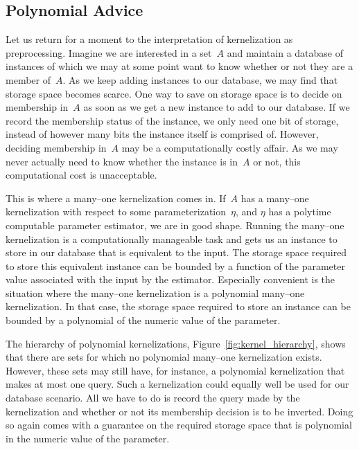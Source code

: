 \subsection{Polynomial Advice}
Let us return for a moment to the interpretation of kernelization as preprocessing.
Imagine we are interested in a set~$A$ and maintain a database of instances of which we may at some point want to know whether or not they are a member of~$A$.
As we keep adding instances to our database, we may find that storage space becomes scarce.
One way to save on storage space is to decide on membership in~$A$ as soon as we get a new instance to add to our database.
If we record the membership status of the instance, we only need one bit of storage, instead of however many bits the instance itself is comprised of.
However, deciding membership in~$A$ may be a computationally costly affair.
As we may never actually need to know whether the instance is in~$A$ or not, this computational cost is unacceptable.

This is where a many--one kernelization comes in.
If~$A$ has a many--one kernelization with respect to some parameterization~$\eta$, and $\eta$ has a polytime computable parameter estimator, we are in good shape.
Running the many--one kernelization is a computationally manageable task and gets us an instance to store in our database that is equivalent to the input.
The storage space required to store this equivalent instance can be bounded by a function of the parameter value associated with the input by the estimator.
Especially convenient is the situation where the many--one kernelization is a polynomial many--one kernelization.
In that case, the storage space required to store an instance can be bounded by a polynomial of the numeric value of the parameter.

The hierarchy of polynomial kernelizations, Figure~\ref{fig:kernel_hierarchy}, shows that there are sets for which no polynomial many--one kernelization exists.
However, these sets may still have, for instance, a polynomial kernelization that makes at most one query.
Such a kernelization could equally well be used for our database scenario.
All we have to do is record the query made by the kernelization and whether or not its membership decision is to be inverted.
Doing so again comes with a guarantee on the required storage space that is polynomial in the numeric value of the parameter.

